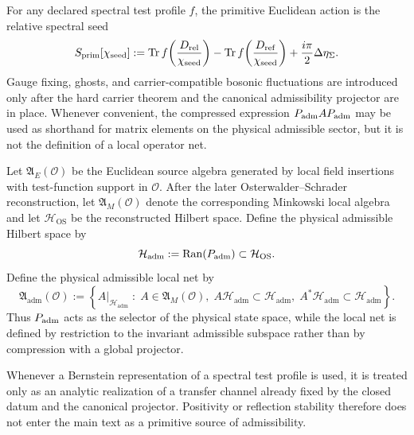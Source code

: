 \begin{definition}
For any declared spectral test profile $f$, the primitive Euclidean action is the relative
spectral seed
\[
S_{\mathrm{prim}}[\chi_{\mathrm{seed}}]
:=
\operatorname{Tr} f\!\left(\frac{D_{\mathrm{rel}}}{\chi_{\mathrm{seed}}}\right)
-
\operatorname{Tr} f\!\left(\frac{D_{\mathrm{ref}}}{\chi_{\mathrm{seed}}}\right)
+\frac{i\pi}{2}\Delta\eta_\Sigma.
\]
Gauge fixing, ghosts, and carrier-compatible bosonic fluctuations are introduced only after the
hard carrier theorem and the canonical admissibility projector are in place. Whenever convenient,
the compressed expression $P_{\mathrm{adm}} AP_{\mathrm{adm}}$ may be used as shorthand for matrix elements on the
physical admissible sector, but it is not the definition of a local operator net.
\end{definition}

\begin{definition}
\label{def:physical-admissible-local-net}
Let $\mathfrak A_E(\mathcal O)$ be the Euclidean source algebra generated by local field insertions
with test-function support in $\mathcal O$. After the later Osterwalder--Schrader reconstruction,
let $\mathfrak A_M(\mathcal O)$ denote the corresponding Minkowski local algebra and let
$\mathcal H_{\mathrm{OS}}$ be the reconstructed Hilbert space. Define the physical admissible
Hilbert space by
\[
\mathcal H_{\mathrm{adm}}:=\operatorname{Ran}(P_{\mathrm{adm}})\subset \mathcal H_{\mathrm{OS}}.
\]
Define the physical admissible local net by
\[
\mathfrak A_{\mathrm{adm}}(\mathcal O)
:=
\left\{
A|_{\mathcal H_{\mathrm{adm}}}\;:\;
A\in\mathfrak A_M(\mathcal O),\;
A\mathcal H_{\mathrm{adm}}\subset \mathcal H_{\mathrm{adm}},\;
A^\ast\mathcal H_{\mathrm{adm}}\subset \mathcal H_{\mathrm{adm}}
\right\}.
\]
Thus $P_{\mathrm{adm}}$ acts as the selector of the physical state space, while the local net is defined by
restriction to the invariant admissible subspace rather than by compression with a global
projector.
\end{definition}

\begin{remark}
\label{ass:bernstein-positivity}
Whenever a Bernstein representation of a spectral test profile is used, it is treated only as an
analytic realization of a transfer channel already fixed by the closed datum and the canonical
projector. Positivity or reflection stability therefore does not enter the main text as a
primitive source of admissibility.
\end{remark}

